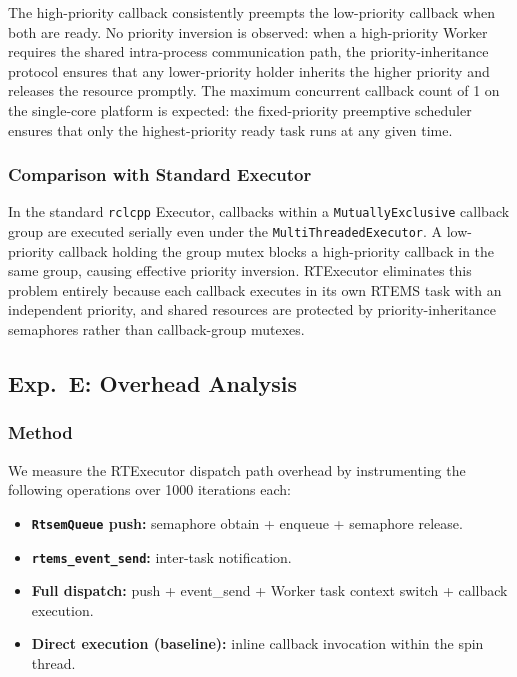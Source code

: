 The high-priority callback consistently preempts the low-priority callback when both are ready.
No priority inversion is observed: when a high-priority Worker requires the shared intra-process communication path, the priority-inheritance protocol ensures that any lower-priority holder inherits the higher priority and releases the resource promptly.
The maximum concurrent callback count of 1 on the single-core platform is expected: the fixed-priority preemptive scheduler ensures that only the highest-priority ready task runs at any given time.

\subsubsection{Comparison with Standard Executor}

In the standard \texttt{rclcpp} Executor, callbacks within a \texttt{MutuallyExclusive} callback group are executed serially even under the \texttt{MultiThreadedExecutor}.
A low-priority callback holding the group mutex blocks a high-priority callback in the same group, causing effective priority inversion.
RTExecutor eliminates this problem entirely because each callback executes in its own RTEMS task with an independent priority, and shared resources are protected by priority-inheritance semaphores rather than callback-group mutexes.

\subsection{Exp.\ E: Overhead Analysis}

\subsubsection{Method}

We measure the RTExecutor dispatch path overhead by instrumenting the following operations over 1000 iterations each:
\begin{itemize}
    \item \textbf{\texttt{RtsemQueue} push:} semaphore obtain + enqueue + semaphore release.
    \item \textbf{\texttt{rtems\_event\_send}:} inter-task notification.
    \item \textbf{Full dispatch:} push + event\_send + Worker task context switch + callback execution.
    \item \textbf{Direct execution (baseline):} inline callback invocation within the spin thread.
\end{itemize}

